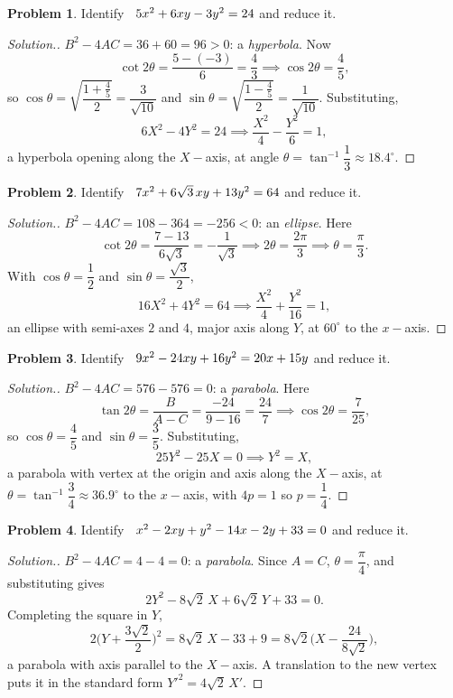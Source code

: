 \documentclass[11pt,a4paper]{article}
\theoremstyle{definition}
\newtheorem{problemx}{Problem}[subsection]
\newenvironment{problem}{\begin{problemx}}{\end{problemx}}
\newenvironment{solution}
  {\renewcommand{\qedsymbol}{}\begin{proof}[\textit{Solution}.]}
  {\end{proof}}
\begin{document}
\begin{problem}
Identify $\hspace{0.2cm} 5x^2 + 6xy - 3y^2 = 24$ and reduce it.
\end{problem}
\begin{solution}
$B^2 - 4AC = 36 + 60 = 96 > 0$: a \emph{hyperbola}. Now
$$\cot 2\theta = \frac{5-(-3)}{6} = \frac{4}{3}
\implies \cos 2\theta = \frac{4}{5},$$
so $\cos\theta = \sqrt{\dfrac{1+\frac45}{2}} = \dfrac{3}{\sqrt{10}}$ and
$\sin\theta = \sqrt{\dfrac{1-\frac45}{2}} = \dfrac{1}{\sqrt{10}}$. Substituting,
$$6X^2 - 4Y^2 = 24 \implies \frac{X^2}{4} - \frac{Y^2}{6} = 1 ,$$
a hyperbola opening along the $X-$axis, at angle
$\theta = \tan^{-1}\dfrac{1}{3} \approx 18.4^{\circ}$.
\end{solution}

\begin{problem}
Identify $\hspace{0.2cm} 7x^2 + 6\sqrt3\,xy + 13y^2 = 64$ and reduce it.
\end{problem}
\begin{solution}
$B^2 - 4AC = 108 - 364 = -256 < 0$: an \emph{ellipse}. Here
$$\cot 2\theta = \frac{7-13}{6\sqrt3} = -\frac{1}{\sqrt3}
\implies 2\theta = \frac{2\pi}{3} \implies \theta = \frac{\pi}{3}.$$
With $\cos\theta = \dfrac12$ and $\sin\theta = \dfrac{\sqrt3}{2}$,
$$16X^2 + 4Y^2 = 64 \implies \frac{X^2}{4} + \frac{Y^2}{16} = 1 ,$$
an ellipse with semi-axes $2$ and $4$, major axis along $Y$, at $60^{\circ}$ to
the $x-$axis.
\end{solution}

\begin{problem}
Identify $\hspace{0.2cm} 9x^2 - 24xy + 16y^2 = 20x + 15y$ and reduce it.
\end{problem}
\begin{solution}
$B^2 - 4AC = 576 - 576 = 0$: a \emph{parabola}. Here
$$\tan 2\theta = \frac{B}{A-C} = \frac{-24}{9-16} = \frac{24}{7}
\implies \cos 2\theta = \frac{7}{25},$$
so $\cos\theta = \dfrac{4}{5}$ and $\sin\theta = \dfrac{3}{5}$. Substituting,
$$25Y^2 - 25X = 0 \implies Y^2 = X ,$$
a parabola with vertex at the origin and axis along the $X-$axis, at
$\theta = \tan^{-1}\dfrac34 \approx 36.9^{\circ}$ to the $x-$axis, with
$4p = 1$ so $p = \dfrac14$.
\end{solution}

\begin{problem}
Identify $\hspace{0.2cm} x^2 - 2xy + y^2 - 14x - 2y + 33 = 0$ and reduce it.
\end{problem}
\begin{solution}
$B^2 - 4AC = 4 - 4 = 0$: a \emph{parabola}. Since $A = C$, $\theta = \dfrac{\pi}{4}$,
and substituting gives
$$2Y^2 - 8\sqrt2\,X + 6\sqrt2\,Y + 33 = 0 .$$
Completing the square in $Y$,
$$2\Big(Y + \frac{3\sqrt2}{2}\Big)^2 = 8\sqrt2\,X - 33 + 9
= 8\sqrt2\Big(X - \frac{24}{8\sqrt2}\Big),$$
a parabola with axis parallel to the $X-$axis. A translation to the new vertex
puts it in the standard form $Y'^2 = 4\sqrt2\,X'$.
\end{solution}
\end{document}
